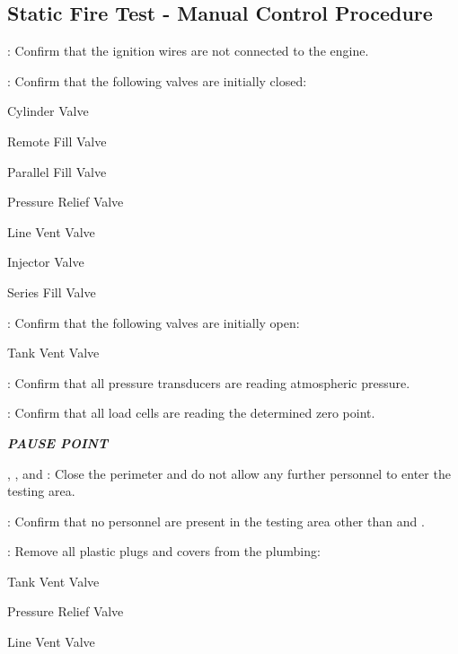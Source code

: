 \newpage
    
\subsection{Static Fire Test - Manual Control Procedure}
\begin{checklist}
    \item \secondary: Confirm that the ignition wires are not connected to the engine.
    \item \primary{}: Confirm that the following valves are initially closed:
    \begin{checklist}
        \item Cylinder Valve
        \item Remote Fill Valve
        \item Parallel Fill Valve
        \item Pressure Relief Valve
        \item Line Vent Valve
        \item Injector Valve
        \item Series Fill Valve
    \end{checklist}
    \item \primary{}: Confirm that the following valves are initially open:
    \begin{checklist}
        \item Tank Vent Valve
    \end{checklist}
    \item \daq{}: Confirm that all pressure transducers are reading atmospheric pressure.
    \item \daq{}: Confirm that all load cells are reading the determined zero point.
    \item \textbf{\textit{PAUSE POINT}}
    \item \peri{}, \perii{}, and \periii{}: Close the perimeter and do not allow any further personnel to enter the testing area.
    \item \secondary: Confirm that no personnel are present in the testing area other than \primary{} and \secondary.
    \item \primary: Remove all plastic plugs and covers from the plumbing:
    \begin {checklist}
        \item Tank Vent Valve
        \item Pressure Relief Valve
        \item Line Vent Valve

\end{checklist}
\end{checklist}
